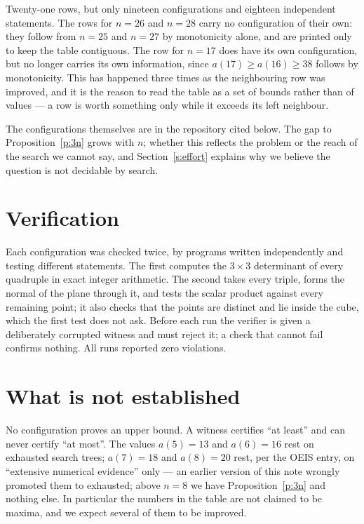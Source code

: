 \documentclass[11pt,a4paper]{article}
\begin{document}
Twenty-one rows, but only nineteen configurations and eighteen independent statements.  The rows
for $n=26$ and $n=28$ carry no configuration of their own: they follow from $n=25$ and $n=27$ by
monotonicity alone, and are printed only to keep the table contiguous.  The row for $n=17$ does
have its own configuration, but no longer carries its own information, since $a(17)\ge a(16)\ge38$ follows by monotonicity.  This has happened three
times as the neighbouring row was improved, and it is the reason to read the table as a set of
bounds rather than of values --- a row is worth something only while it exceeds its left neighbour.

The configurations themselves are in the repository cited below.  The gap to
Proposition~\ref{p:3n} grows with $n$; whether this reflects the problem or the reach of the
search we cannot say, and Section~\ref{s:effort} explains why we believe the question is not
decidable by search.

\section{Verification}
Each configuration was checked twice, by programs written independently and testing different
statements.  The first computes the $3\times3$ determinant of every quadruple in exact integer
arithmetic.  The second takes every triple, forms the normal of the plane through it, and tests
the scalar product against every remaining point; it also checks that the points are distinct
and lie inside the cube, which the first test does not ask.  Before each run the verifier is
given a deliberately corrupted witness and must reject it; a check that cannot fail confirms
nothing.  All runs reported zero violations.

\section{What is not established}\label{s:notest}
No configuration proves an upper bound.  A witness certifies ``at least'' and can never certify
``at most''.  The values $a(5)=13$ and $a(6)=16$ rest on exhausted search trees; $a(7)=18$ and
$a(8)=20$ rest, per the OEIS entry, on ``extensive numerical evidence'' only --- an earlier
version of this note wrongly promoted them to exhausted; above $n=8$ we have
Proposition~\ref{p:3n} and nothing else.  In particular the numbers
in the table are not claimed to be maxima, and we expect several of them to be improved.
\end{document}
